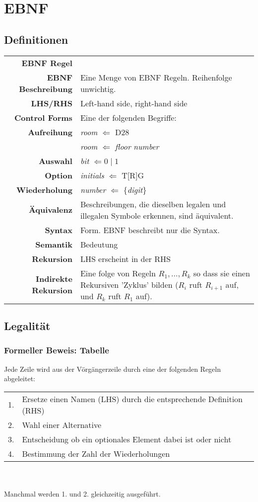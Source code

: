 \documentclass[12pt,a4paper]{article}
\begin{document}
\tableofcontents

\newpage
\section{EBNF}
\subsection{Definitionen}
\begin{tabularx}{\linewidth}{r X}
\textbf{EBNF Regel} & \\
\textbf{EBNF Beschreibung} & Eine Menge von EBNF Regeln. Reihenfolge unwichtig.\\
\textbf{LHS/RHS} & Left-hand side, right-hand side\\
\textbf{Control Forms} & Eine der folgenden Begriffe:\\
\quad \quad \textbf{Aufreihung} & \textit{room} $\Leftarrow$ D28\\
& \textit{room} $\Leftarrow$ \textit{floor} \textit{number}\\
\quad \quad \textbf{Auswahl} & \textit{bit} $\Leftarrow 0 \mid 1$\\
\quad \quad \textbf{Option} & \textit{initials} $\Leftarrow$ T[R]G\\
\quad \quad \textbf{Wiederholung} & \textit{number} $\Leftarrow$ \{\textit{digit}\}\\
\textbf{Äquivalenz} & Beschreibungen, die dieselben legalen und illegalen Symbole erkennen, sind äquivalent.\\
\textbf{Syntax} & Form. EBNF beschreibt nur die Syntax.\\
\textbf{Semantik} & Bedeutung\\ %
\textbf{Rekursion} & LHS erscheint in der RHS\\
\textbf{Indirekte Rekursion} & Eine folge von Regeln $R_1, \hdots, R_k$ so dass sie einen Rekursiven 'Zyklus' bilden ($R_i$ ruft $R_{i+1}$ auf, und $R_k$ ruft $R_1$ auf).
\end{tabularx}
\newpage
\subsection{Legalität}
\subsubsection{Formeller Beweis: Tabelle}
Jede Zeile wird aus der Vörgängerzeile durch eine der folgenden Regeln abgeleitet:\\
\begin{tabularx}{\linewidth}{l X}
1. & Ersetze einen Namen (LHS) durch die entsprechende Definition (RHS)\\
2. & Wahl einer Alternative\\
3. & Entscheidung ob ein optionales Element dabei ist oder nicht\\
4. & Bestimmung der Zahl der Wiederholungen
\end{tabularx}\\\\
Manchmal werden 1. und 2. gleichzeitig ausgeführt.
\end{document}
